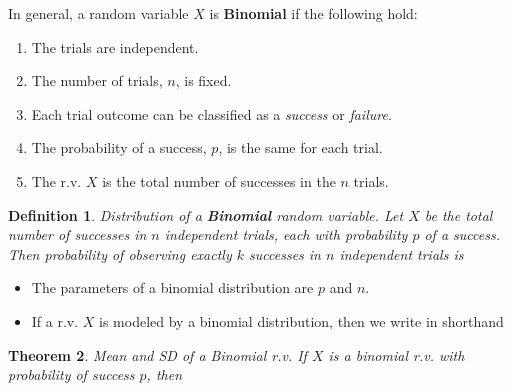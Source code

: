 \documentclass[12pt]{amsart}
\newtheorem{theorem}{Theorem}[section]
\newtheorem{definition}[theorem]{Definition}
\begin{document}
{\vspace{0.5cm}

In general, a random variable $X$ is \textbf{Binomial} if the following hold:

\vspace{0.5cm}
\begin{enumerate}
\item The trials are independent.
\item The number of trials, $n$, is fixed. 
\item Each trial outcome can be classified as a \emph{success} or \emph{failure}.
\item The probability of a success, $p$, is the same for each trial.
\item The r.v. $X$ is the total number of successes in the $n$ trials.
\end{enumerate}



\vspace{.5cm}

\begin{definition}{Distribution of a \textbf{Binomial} random variable.} \newline
Let $X$ be the total number of successes in $n$ independent trials, each with probability $p$ of a success. \newline
Then probability of observing exactly $k$ successes in $n$ independent trials is 
\vspace{3cm}
\end{definition}


\begin{itemize}
\item The parameters of a binomial distribution are $p$ and $n$. 
\item If a r.v. $X$ is modeled by a binomial distribution, then we write in shorthand


\end{itemize}



\newpage
\begin{theorem}{Mean and SD of a Binomial r.v.} \newline
If $X$ is a binomial r.v. with probability of success $p$, then 


\end{theorem}}
\end{document}
